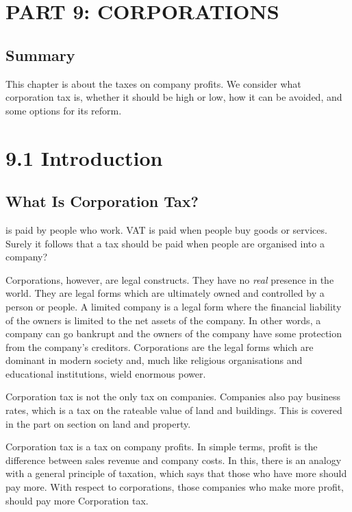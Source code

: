 \documentclass[]{tufte-handout}
\begin{document}
\newpage

\hypertarget{part-9-corporations}{%
\section{PART 9: CORPORATIONS}\label{part-9-corporations}}

\hypertarget{summary-2}{%
\subsection{Summary}\label{summary-2}}

This chapter is about the taxes on company profits. We consider what
corporation tax is, whether it should be high or low, how it can be
avoided, and some options for its reform.

\hypertarget{introduction}{%
\section{9.1 Introduction}\label{introduction}}

\hypertarget{what-is-corporation-tax}{%
\subsection{What Is Corporation Tax?}\label{what-is-corporation-tax}}

 is paid by people who work. VAT is paid
when people buy goods or services. Surely it follows that a tax should
be paid when people are organised into a company?

Corporations, however, are legal constructs. They have no \emph{real}
presence in the world. They are legal forms which are ultimately owned
and controlled by a person or people. A limited company is a legal form
where the financial liability of the owners is limited to the net assets
of the company. In other words, a company can go bankrupt and the owners
of the company have some protection from the company's creditors.
Corporations are the legal forms which are dominant in modern society
and, much like religious organisations and educational institutions,
wield enormous power.

Corporation tax is not the only tax on companies. Companies also pay
business rates, which is a tax on the rateable value of land and
buildings. This is covered in the part on section on land and property.

Corporation tax is a tax on company profits. In simple terms, profit is
the difference between sales revenue and company costs. In this, there
is an analogy with a general principle of taxation, which says that
those who have more should pay more. With respect to corporations, those
companies who make more profit, should pay more Corporation tax.
\end{document}
